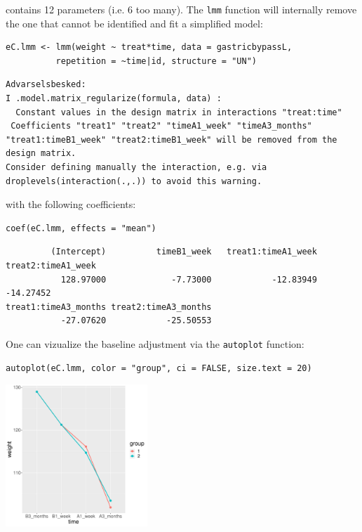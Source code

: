 \documentclass[12pt]{article}
\begin{document}
contains 12 parameters (i.e. 6 too many). The \texttt{lmm} function will
internally remove the one that cannot be identified and fit a
simplified model:
\lstset{language=r,label= ,caption= ,captionpos=b,numbers=none}
\begin{lstlisting}
eC.lmm <- lmm(weight ~ treat*time, data = gastricbypassL,
	      repetition = ~time|id, structure = "UN")
\end{lstlisting}

\begin{verbatim}
Advarselsbesked:
I .model.matrix_regularize(formula, data) :
  Constant values in the design matrix in interactions "treat:time"
 Coefficients "treat1" "treat2" "timeA1_week" "timeA3_months" "treat1:timeB1_week" "treat2:timeB1_week" will be removed from the design matrix. 
Consider defining manually the interaction, e.g. via droplevels(interaction(.,.)) to avoid this warning.
\end{verbatim}


with the following coefficients:
\lstset{language=r,label= ,caption= ,captionpos=b,numbers=none}
\begin{lstlisting}
coef(eC.lmm, effects = "mean")
\end{lstlisting}

\begin{verbatim}
         (Intercept)          timeB1_week   treat1:timeA1_week   treat2:timeA1_week 
           128.97000             -7.73000            -12.83949            -14.27452 
treat1:timeA3_months treat2:timeA3_months 
           -27.07620            -25.50553
\end{verbatim}


One can vizualize the baseline adjustment via the \texttt{autoplot} function:
\lstset{language=r,label= ,caption= ,captionpos=b,numbers=none}
\begin{lstlisting}
autoplot(eC.lmm, color = "group", ci = FALSE, size.text = 20)
\end{lstlisting}

\begin{center}
\includegraphics[width=0.4\textwidth]{./figures/gg-baseAdj.pdf}
\end{center}
\end{document}
